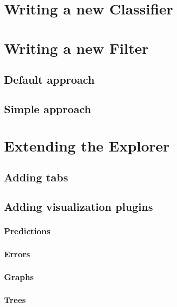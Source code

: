 
\section{Writing a new Classifier}

\section{Writing a new Filter}

\subsection{Default approach}

\subsection{Simple approach}

\section{Extending the Explorer}

\subsection{Adding tabs}

\subsection{Adding visualization plugins}

\subsubsection*{Predictions}

\subsubsection*{Errors}

\subsubsection*{Graphs}

\subsubsection*{Trees}
